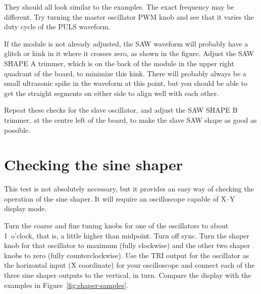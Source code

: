 They should all look similar to the examples.  The exact frequency may be
different.  Try turning the master oscillator PWM knob and see that it
varies the duty cycle of the PULS waveform.

If the module is not already adjusted, the SAW waveform will probably have a
glitch or kink in it where it crosses zero, as shown in the figure.  Adjust
the SAW SHAPE A trimmer, which is on the back of the module in the upper
right quadrant of the board, to minimize this kink.  There will probably
always be a small ultrasonic spike in the waveform at this point, but you
should be able to get the straight segments on either side to align well
with each other.

Repeat these checks for the slave oscillator, and adjust the SAW SHAPE B
trimmer, at the centre left of the board, to make the slave SAW shape as
good as possible.

\section{Checking the sine shaper}

This test is not absolutely necessary, but it provides an easy way of
checking the operation of the sine shaper.  It will require an oscilloscope
capable of X--Y display mode.

Turn the coarse and fine tuning knobs for one of the oscillators to about
1~o'clock, that is, a little higher than midpoint.  Turn off sync.  Turn the
shaper knob for that oscillator to maximum (fully clockwise) and the other
two shaper knobs to zero (fully counterclockwise).  Use the TRI output for
the oscillator as the horizontal input (X coordinate) for your oscilloscope
and connect each of the three sine shaper outputs to the vertical, in turn. 
Compare the display with the examples in Figure~\ref{fig:shaper-samples}.

